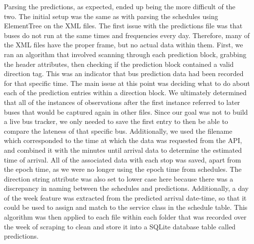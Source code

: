 \documentclass[]{article}
\begin{document}
	Parsing the predictions, as expected, ended up being the more difficult of the two. The initial setup was the same as with parsing the schedules using ElementTree on the XML files. The first issue with the predictions file was that buses do not run at the same times and frequencies every day. Therefore, many of the XML files have the proper frame, but no actual data within them. First, we ran an algorithm that involved scanning through each prediction block, grabbing the header attributes, then checking if the prediction block contained a valid direction tag. This was an indicator that bus prediction data had been recorded for that specific time. The main issue at this point was deciding what to do about each of the prediction entries within a direction block. We ultimately determined that all of the instances of observations after the first instance referred to later buses that would be captured again in other files. Since our goal was not to build a live bus tracker, we only needed to save the first entry to then be able to compare the lateness of that specific bus. Additionally, we used the filename which corresponded to the time at which the data was requested from the API, and combined it with the minutes until arrival data to determine the estimated time of arrival. All of the associated data with each stop was saved, apart from the epoch time, as we were no longer using the epoch time from schedules. The direction string attribute was also set to lower case here because there was a discrepancy in naming between the schedules and predictions. Additionally, a day of the week feature was extracted from the predicted arrival date-time, so that it could be used to assign and match to the service class in the schedule table. This algorithm was then applied to each file within each folder that was recorded over the week of scraping to clean and store it into a SQLite database table called predictions. 
	
\end{document}
